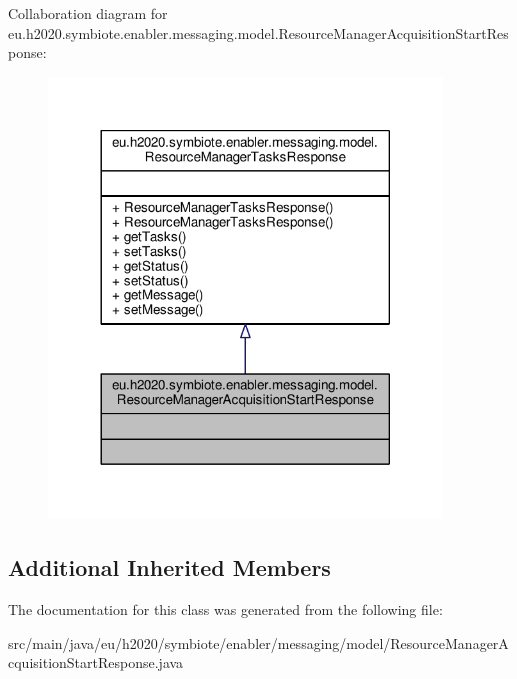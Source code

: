 Collaboration diagram for eu.\+h2020.\+symbiote.\+enabler.\+messaging.\+model.\+Resource\+Manager\+Acquisition\+Start\+Response\+:
\nopagebreak
\begin{figure}[H]
\begin{center}
\leavevmode
\includegraphics[width=296pt]{classeu_1_1h2020_1_1symbiote_1_1enabler_1_1messaging_1_1model_1_1ResourceManagerAcquisitionStartResponse__coll__graph}
\end{center}
\end{figure}
\subsection*{Additional Inherited Members}


The documentation for this class was generated from the following file\+:\begin{DoxyCompactItemize}
\item 
src/main/java/eu/h2020/symbiote/enabler/messaging/model/Resource\+Manager\+Acquisition\+Start\+Response.\+java\end{DoxyCompactItemize}
